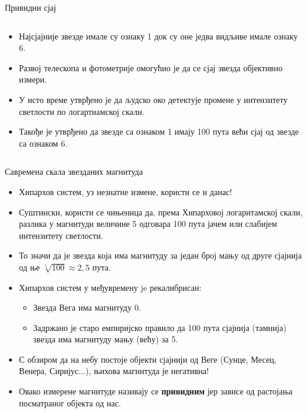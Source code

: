 \documentclass[aspectratio=169, xcolor=table, 10pt]{beamer}
\theoremstyle{definition}
\begin{document}
\begin{frame}{Привидни сјај}
\begin{columns}[T]
\begin{column}{0.65\textwidth}
\begin{itemize}
        \item Најсјајније звезде имале су ознаку 1 док су оне једва видљиве имале ознаку 6.
        \item Развој телескопа и фотометрије омогућио је да се сјај звезда објективно измери.
        \item У исто време утврђено је да људско око детектује промене у интензитету светлости по логартиамској скали.
        \item Такође је утврђено да звезде са ознаком 1 имају 100 пута већи сјај од звезде са ознаком 6.
      \end{itemize}
    \end{column}
  \end{columns}
\end{frame}

\begin{frame}{Савремена скала звезданих магнитуда}
  \begin{itemize}
    \item Хипархов систем, уз незнатне измене, користи се и данас!
    \item Суштински, користи се чињеница да, према Хипарховој логаритамској скали, разлика у магнитуди величине 5 одговара 100 пута јачем или слабијем интензитету светлости.
    \item То значи да је звезда која има магнитуду за један број мању од друге сјајнија од ње $\sqrt[5]{100}\approx2,5$ пута.
    \item Хипархов систем у међувремену je рекалибрисан:
    \begin{itemize}
      \item Звезда Вега има магнитуду 0.
      \item Задржано је старо емпиријско правило да 100 пута сјајнија (тамнија) звезда има магнитуду мању (већу) за 5.
    \end{itemize}
  \item С обзиром да на небу постоје објекти сјајнији од Веге (Сунце, Месец, Венера, Сиријус...), њихова магнитуда је негативна!
  \item Овако измерене магнитуде називају се \textbf{привидним} јер зависе од растојања посматраног објекта од нас.
  \end{itemize}
\end{frame}
\end{document}
